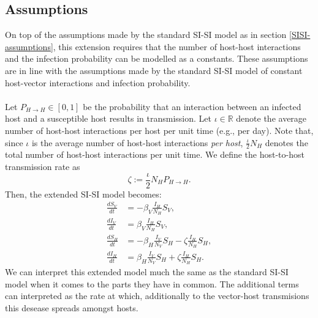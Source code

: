 \subsection*{Assumptions}
On top of the assumptions made by the standard SI-SI model as in section \ref{SISI-assumptions}, this extension requires that the number of host-host interactions and the infection probability can be modelled as a constants.
These assumptions are in line with the assumptions made by the standard SI-SI model of constant 
host-vector interactions and infection probability.
\\\\
Let $P_{H \to H} \in [0,1]$ be the probability that an interaction between an
infected host and a susceptible host results in transmission.
Let $\iota \in \mathbb{R}$ denote the average number of host-host
interactions per host per unit time (e.g., per day). 
Note that, since $\iota$ is the average number of host-host interactions \emph{per host},
$\frac{\iota}{2}N_H$ denotes the total number of host-host interactions per unit time.
We define the host-to-host transmission rate as
\begin{equation}\label{hth-def-rate}
    \zeta := \frac{\iota}{2} N_H P_{H \to H}.
\end{equation}
Then, the extended SI-SI model becomes:
\begin{align*}
    \frac{dS_V}{dt} &= -\beta_V \frac{I_H}{N_H} S_V, \\
    \frac{dI_V}{dt} &= \beta_V \frac{I_H}{N_H} S_V, \\
    \frac{dS_H}{dt} &= -\beta_H \frac{I_V}{N_V} S_H - \zeta \frac{I_H}{N_H} S_H, \\
    \frac{dI_H}{dt} &= \beta_H \frac{I_V}{N_V} S_H + \zeta \frac{I_H}{N_H} S_H.
\end{align*}
We can interpret this extended model much the same as the standard SI-SI model when it comes to the parts they have in common. The additional terms can interpreted as the rate at which, additionally to the vector-host transmisions this desease spreads amongst hosts.